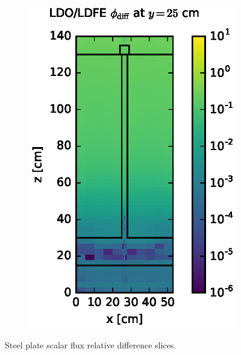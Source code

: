 \documentclass{article} %
\begin{document}
\begin{figure}[!htb]
\begin{subfigure}{0.4\textwidth}
\includegraphics[max height=0.445\textheight]
{steel-flux-diff-ldfe.eps}
\end{subfigure}
\caption{Steel plate scalar flux relative difference slices.}
\label{steel-fwd-diff-rel}
\end{figure}
\end{document}
